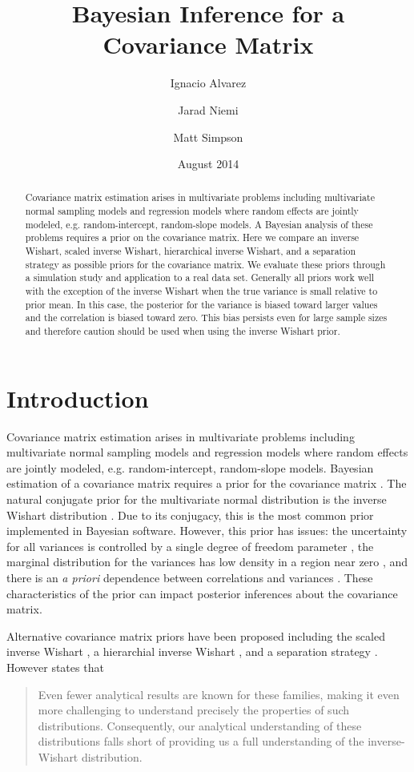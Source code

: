 \documentclass[12pt]{article}
\title{Bayesian Inference for a Covariance Matrix}
\author[1]{Ignacio Alvarez }
\author[1]{Jarad Niemi }
\author[2]{ Matt Simpson}
\affil[1]{Department of Statistics, Iowa State University}
\affil[2]{Department of Statistics and Department of Economics, Iowa State University}
\date{August 2014}
\begin{document}
 
\maketitle 


\begin{abstract}
Covariance matrix estimation arises in multivariate problems including multivariate normal sampling models and regression models where random effects are jointly modeled, e.g. random-intercept, random-slope models. A Bayesian analysis of these problems requires a prior on the covariance matrix. Here we compare an inverse Wishart, scaled inverse Wishart, hierarchical inverse Wishart, and a separation strategy as possible priors for the covariance matrix. We evaluate these priors through a simulation study and application to a real data set. Generally all priors work well with the exception of the inverse Wishart when the true variance is small relative to prior mean. In this case, the posterior for the variance is biased toward larger values and the correlation is biased toward zero. This bias persists even for large sample sizes and therefore caution should be used when using the inverse Wishart prior.
\end{abstract}


\section{Introduction} 

Covariance matrix estimation arises in multivariate problems including multivariate normal sampling models and regression models where random effects are jointly modeled, e.g. random-intercept, random-slope models. Bayesian estimation of a covariance matrix requires a prior for the covariance matrix . The natural conjugate prior for the multivariate normal distribution is the inverse Wishart distribution \citep{barnard2000}. Due to its conjugacy, this is the most common prior implemented in Bayesian software. However, this prior has issues: the uncertainty for all variances is controlled by a single degree of freedom parameter \citep{bda2013}, the marginal distribution for the variances has low density in a region near zero \citep{gelman2006prior}, and there is an \emph{a priori} dependence between correlations and variances \citep{visualize}. These characteristics of the prior can impact posterior inferences about the covariance matrix. 

Alternative covariance matrix priors have been proposed including the scaled inverse Wishart \citep{odomain}, a hierarchial inverse Wishart \citep{huang2013simple}, and a separation strategy \citep{barnard2000}. However \cite{visualize} states that 
\begin{quote}
Even fewer analytical results are known for these families, making it even more challenging to understand precisely the properties of such distributions. Consequently, our analytical understanding of these distributions falls short of providing us a full understanding of the inverse-Wishart distribution.
 \end{quote}
 
\end{document}
